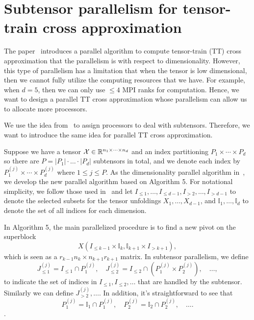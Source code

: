 \documentclass[11pt,a4paper,review]{siamart220329}
\begin{document}
\section{Subtensor parallelism for tensor-train cross approximation}
\label{sec:subTTcross}
The paper~\cite{dolgov2020parallel} introduces a parallel algorithm to compute tensor-train (TT) cross approximation that the parallelism is with respect to dimensionality. However, this type of parallelism has a limitation that when the tensor is low dimensional, then we cannot fully utilize the computing resources that we have. For example, when $d = 5$, then we can only use $\le 4$ MPI ranks for computation. Hence, we want to design a parallel TT cross approximation whose parallelism can allow us to allocate more processors.

We use the idea from~\cite{shi2023parallel} to assign processors to deal with subtensors. Therefore, we want to introduce the same idea for parallel TT cross approximation.

Suppose we have a tensor $\mathcal{X} \in \mathbb{R}^{n_1 \times \cdots \times n_d}$ and an index partitioning $P_1 \times \cdots \times P_d$ so there are $P = |P_1|\cdot\dots\cdot|P_d|$ subtensors in total, and we denote each index by $P_1^{(j)} \times \cdots \times P_d^{(j)}$ where $1 \le j \le P$. As the dimensionality parallel algorithm in~\cite{dolgov2020parallel}, we develop the new parallel algorithm based on Algorithm 5. For notational simplicity, we follow those used in~\cite{dolgov2020parallel} and let $I_{\le 1}, \dots, I_{\le d-1}, I_{>2}, \dots, I_{>d-1}$ to denote the selected subsets for the tensor unfoldings $X_1, \dots, X_{d-1}$, and $\mathbb{I}_1,\dots,\mathbb{I}_d$ to denote the set of all indices for each dimension.

In Algorithm 5, the main parallelized procedure is to find a new pivot on the superblock 
\[ X(I_{\le k-1}\times\mathbb{I}_k,\mathbb{I}_{k+1}\times I_{>k+1}), \] 
which is seen as a $r_{k-1}n_k \times n_{k+1}r_{k+1}$ matrix. In subtensor parallelism, we define 
\[ J_{\le 1}^{(j)} = I_{\le 1} \cap P_1^{(j)}, \quad J_{\le 2}^{(j)} = I_{\le 2} \cap (P_1^{(j)} \times P_2^{(j)}), \quad\dots, \] 
to indicate the set of indices in $I_{\le 1}, I_{\le 2}, \dots$ that are handled by the subtensor. Similarly we can define $J_{> 2}^{(j)},\dots$. In addition, it's straightforward to see that 
\[ P_1^{(j)} = \mathbb{I}_1 \cap P_1^{(j)}, \quad P_2^{(j)} = \mathbb{I}_2 \cap P_2^{(j)},\quad \dots. \].
\end{document}
